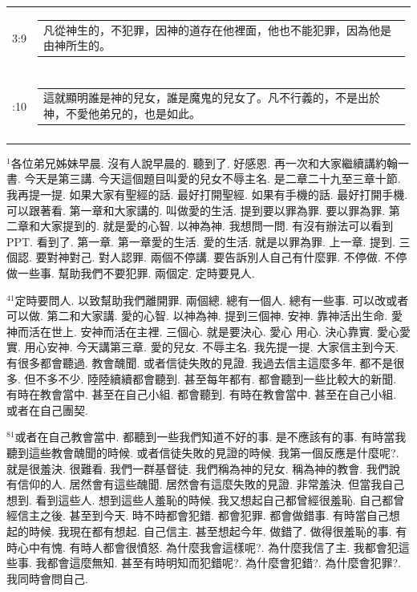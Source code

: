 \documentclass{book}
\begin{document}
\begin{longtable}{cl}
3:9 & \begin{tabularx}{0.7\textwidth}{X} 凡從神生的，不犯罪，因神的道存在他裡面，他也不能犯罪，因為他是由神所生的。 \end{tabularx} \\ \\ \relax
3:10 & \begin{tabularx}{0.7\textwidth}{X} 這就顯明誰是神的兒女，誰是魔鬼的兒女了。凡不行義的，不是出於神，不愛他弟兄的，也是如此。 \end{tabularx} \\ \\
[1ex]
\hline
\hline
\end{longtable}
$^{1}$各位弟兄姊妹早晨.
沒有人說早晨的.
聽到了.
好感恩.
再一次和大家繼續講約翰一書.
今天是第三講.
今天這個題目叫愛的兒女不辱主名.
是二章二十九至三章十節.
我再提一提.
如果大家有聖經的話.
最好打開聖經.
如果有手機的話.
最好打開手機.
可以跟著看.
第一章和大家講的.
叫做愛的生活.
提到要以罪為罪.
要以罪為罪.
第二章和大家提到的.
就是愛的心智.
以神為神.
我想問一問.
有沒有辦法可以看到PPT.
看到了.
第一章.
第一章愛的生活.
愛的生活.
就是以罪為罪.
上一章.
提到.
三個認.
要對神對己.
對人認罪.
兩個不停講.
要告訴別人自己有什麼罪.
不停做.
不停做一些事.
幫助我們不要犯罪.
兩個定.
定時要見人.

$^{41}$定時要問人.
以致幫助我們離開罪.
兩個總.
總有一個人.
總有一些事.
可以改或者可以做.
第二和大家講.
愛的心智.
以神為神.
提到三個神.
安神.
靠神活出生命.
愛神而活在世上.
安神而活在主裡.
三個心.
就是要決心.
愛心 用心.
決心靠實.
愛心愛實.
用心安神.
今天講第三章.
愛的兒女.
不辱主名.
我先提一提.
大家信主到今天.
有很多都會聽過.
教會醜聞.
或者信徒失敗的見證.
我過去信主這麼多年.
都不是很多.
但不多不少.
陸陸續續都會聽到.
甚至每年都有.
都會聽到一些比較大的新聞.
有時在教會當中.
甚至在自己小組.
都會聽到.
有時在教會當中.
甚至在自己小組.
或者在自己團契.

$^{81}$或者在自己教會當中.
都聽到一些我們知道不好的事.
是不應該有的事.
有時當我聽到這些教會醜聞的時候.
或者信徒失敗的見證的時候.
我第一個反應是什麼呢?.
就是很羞決.
很難看.
我們一群基督徒.
我們稱為神的兒女.
稱為神的教會.
我們說有信仰的人.
居然會有這些醜聞.
居然會有這麼失敗的見證.
非常羞決.
但當我自己想到.
看到這些人.
想到這些人羞恥的時候.
我又想起自己都曾經很羞恥.
自己都曾經信主之後.
甚至到今天.
時不時都會犯錯.
都會犯罪.
都會做錯事.
有時當自己想起的時候.
我現在都有想起.
自己信主.
甚至想起今年.
做錯了.
做得很羞恥的事.
有時心中有愧.
有時人都會很憤怒.
為什麼我會這樣呢?.
為什麼我信了主.
我都會犯這些事.
我都會這麼無知.
甚至有時明知而犯錯呢?.
為什麼會犯錯?.
為什麼會犯罪?.
我同時會問自己.
\end{document}
